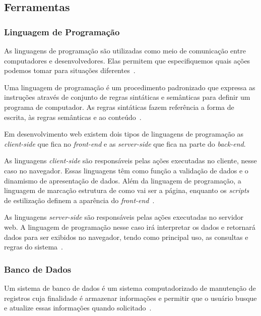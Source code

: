 \subsection{Ferramentas}


\subsubsection{Linguagem de Programação}

As linguagens de programação são utilizadas como meio de comunicação entre computadores e desenvolvedores. 
Elas permitem que especifiquemos quais ações podemos tomar para situações diferentes~\cite{costa2017colossus}.

Uma linguagem de programação é um procedimento padronizado que expressa as instruções através de conjunto de regras sintáticas e semânticas para definir um programa de computador.
As regras sintáticas fazem referência a forma de escrita, às regras semânticas e ao conteúdo~\cite{gotardo2015linguagem}.

Em desenvolvimento web existem dois tipos de linguagens de programação as \textit{client-side} que fica no \textit{front-end} e as \textit{server-side} que fica na parte do \textit{back-end}.

As linguagens \textit{client-side} são responsáveis pelas ações executadas no cliente, nesse caso no navegador.
Essas linguagens têm como função a validação de dados e o dinamismo de apresentação de dados.
Além da linguagem de programação, a linguagem de marcação estrutura de como vai ser a página, enquanto os \textit{scripts} de estilização definem a aparência do \textit{front-end}~\cite{silveira2015desenvolvimento}.

As linguagens \textit{server-side} são responsáveis pelas ações executadas no servidor web.
A linguagem de programação nesse caso irá interpretar os dados e retornará dados para ser exibidos no navegador, tendo como principal uso, as consultas e regras do sistema~\cite{campos2007realidade}.

\subsubsection{Banco de Dados}

Um sistema de banco de dados é um sistema computadorizado de manutenção de registros cuja finalidade é armazenar informações e permitir que o usuário busque e atualize essas informações quando solicitado~\cite{date2004introduccao}.

